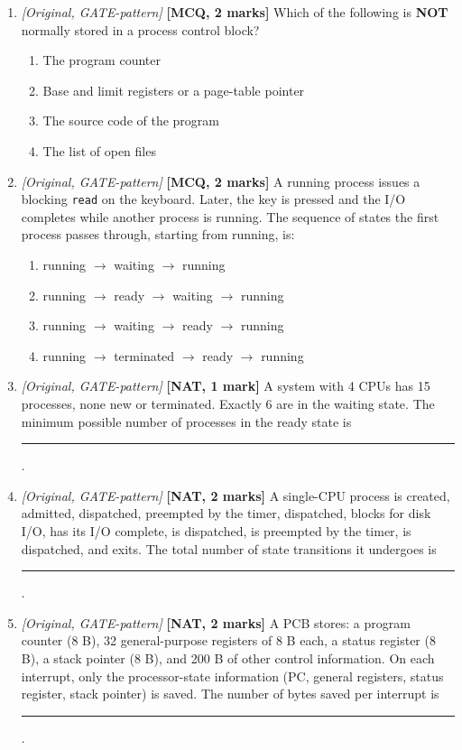 \documentclass[11pt]{article}
\begin{document}
\begin{enumerate}
\item[\textbf{Q4}] \textit{[Original, GATE-pattern]} \textbf{[MCQ, 2 marks]} Which of the following is \textbf{NOT} normally stored in a process control block?
\begin{enumerate}
  \item[(A)] The program counter
  \item[(B)] Base and limit registers or a page-table pointer
  \item[(C)] The source code of the program
  \item[(D)] The list of open files
\end{enumerate}

\item[\textbf{Q5}] \textit{[Original, GATE-pattern]} \textbf{[MCQ, 2 marks]} A running process issues a blocking \texttt{read} on the keyboard. Later, the key is pressed and the I/O completes while another process is running. The sequence of states the first process passes through, starting from running, is:
\begin{enumerate}
  \item[(A)] running $\to$ waiting $\to$ running
  \item[(B)] running $\to$ ready $\to$ waiting $\to$ running
  \item[(C)] running $\to$ waiting $\to$ ready $\to$ running
  \item[(D)] running $\to$ terminated $\to$ ready $\to$ running
\end{enumerate}

\item[\textbf{Q6}] \textit{[Original, GATE-pattern]} \textbf{[NAT, 1 mark]} A system with 4 CPUs has 15 processes, none new or terminated. Exactly 6 are in the waiting state. The minimum possible number of processes in the ready state is \rule{1.5cm}{0.4pt}.

\item[\textbf{Q7}] \textit{[Original, GATE-pattern]} \textbf{[NAT, 2 marks]} A single-CPU process is created, admitted, dispatched, preempted by the timer, dispatched, blocks for disk I/O, has its I/O complete, is dispatched, is preempted by the timer, is dispatched, and exits. The total number of state transitions it undergoes is \rule{1.5cm}{0.4pt}.

\item[\textbf{Q8}] \textit{[Original, GATE-pattern]} \textbf{[NAT, 2 marks]} A PCB stores: a program counter (8 B), 32 general-purpose registers of 8 B each, a status register (8 B), a stack pointer (8 B), and 200 B of other control information. On each interrupt, only the processor-state information (PC, general registers, status register, stack pointer) is saved. The number of bytes saved per interrupt is \rule{1.5cm}{0.4pt}.


\end{enumerate}
\end{document}
